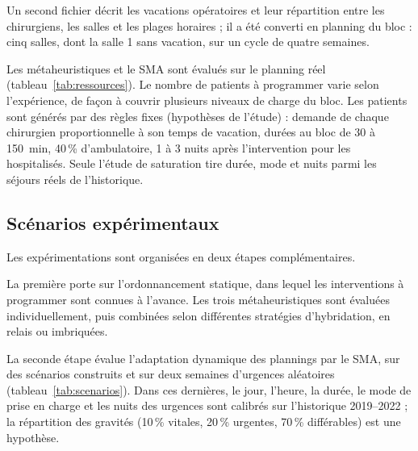 \documentclass[11pt,a4paper]{article}
\begin{document}
Un second fichier décrit les vacations opératoires et leur répartition entre les chirurgiens, les salles et les plages horaires ; il a été converti en planning du bloc : cinq salles, dont la salle 1 sans vacation, sur un cycle de quatre semaines.

Les métaheuristiques et le SMA sont évalués sur le planning réel (tableau~\ref{tab:ressources}). Le nombre de patients à programmer varie selon l'expérience, de façon à couvrir plusieurs niveaux de charge du bloc. Les patients sont générés par des règles fixes (hypothèses de l'étude) : demande de chaque chirurgien proportionnelle à son temps de vacation, durées au bloc de 30 à 150~min, 40\,\% d'ambulatoire, 1 à 3 nuits après l'intervention pour les hospitalisés. Seule l'étude de saturation tire durée, mode et nuits parmi les séjours réels de l'historique.


\subsection{Scénarios expérimentaux}

Les expérimentations sont organisées en deux étapes complémentaires.

La première porte sur l'ordonnancement statique, dans lequel les interventions à programmer sont connues à l'avance. Les trois métaheuristiques sont évaluées individuellement, puis combinées selon différentes stratégies d'hybridation, en relais ou imbriquées.

La seconde étape évalue l'adaptation dynamique des plannings par le SMA, sur des scénarios construits et sur deux semaines d'urgences aléatoires (tableau~\ref{tab:scenarios}). Dans ces dernières, le jour, l'heure, la durée, le mode de prise en charge et les nuits des urgences sont calibrés sur l'historique 2019--2022 ; la répartition des gravités (10\,\% vitales, 20\,\% urgentes, 70\,\% différables) est une hypothèse.
\end{document}
